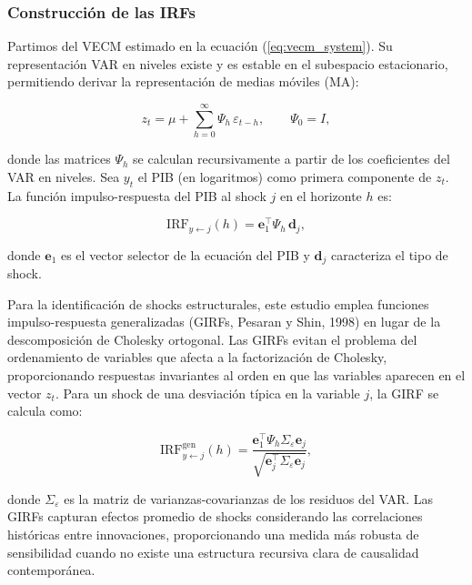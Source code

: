 \documentclass[3p,11pt,draft,natbib=false]{elsarticle}
\begin{document}
\subsubsection{Construcción de las IRFs}

Partimos del VECM estimado en la ecuación (\ref{eq:vecm_system}). Su representación VAR en niveles existe y es estable en el subespacio estacionario, permitiendo derivar la representación de medias móviles (MA):

\begin{equation}
z_t = \mu + \sum_{h=0}^{\infty} \Psi_h\, \varepsilon_{t-h}, \qquad \Psi_0 = I,
\label{eq:ma_representation}
\end{equation}

donde las matrices $\Psi_h$ se calculan recursivamente a partir de los coeficientes del VAR en niveles. Sea $y_t$ el PIB (en logaritmos) como primera componente de $z_t$. La función impulso-respuesta del PIB al shock $j$ en el horizonte $h$ es:

\begin{equation}
\text{IRF}_{y \leftarrow j}(h) = \mathbf{e}_1^\top \Psi_h\, \mathbf{d}_j,
\label{eq:irf_definition}
\end{equation}

donde $\mathbf{e}_1$ es el vector selector de la ecuación del PIB y $\mathbf{d}_j$ caracteriza el tipo de shock.

Para la identificación de shocks estructurales, este estudio emplea funciones impulso-respuesta generalizadas (GIRFs, Pesaran y Shin, 1998) en lugar de la descomposición de Cholesky ortogonal. Las GIRFs evitan el problema del ordenamiento de variables que afecta a la factorización de Cholesky, proporcionando respuestas invariantes al orden en que las variables aparecen en el vector $z_t$. Para un shock de una desviación típica en la variable $j$, la GIRF se calcula como:

\begin{equation}
\text{IRF}^{\text{gen}}_{y \leftarrow j}(h) = \frac{ \mathbf{e}_1^\top \Psi_h \Sigma_\varepsilon \mathbf{e}_j }{ \sqrt{ \mathbf{e}_j^\top \Sigma_\varepsilon \mathbf{e}_j } },
\label{eq:girf}
\end{equation}

donde $\Sigma_\varepsilon$ es la matriz de varianzas-covarianzas de los residuos del VAR. Las GIRFs capturan efectos promedio de shocks considerando las correlaciones históricas entre innovaciones, proporcionando una medida más robusta de sensibilidad cuando no existe una estructura recursiva clara de causalidad contemporánea.
\end{document}
